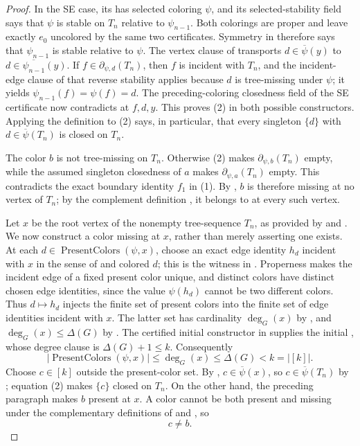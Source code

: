 \begin{proof}
In the SE case, its  has selected
coloring $\psi$, and its selected-stability field says that $\psi$ is
stable on $T_n$ relative to $\psi_{n-1}$.  Both colorings are proper and
leave exactly $e_0$ uncolored by the same two certificates.  Symmetry in
 therefore says that $\psi_{n-1}$ is stable relative to
$\psi$.  The vertex clause of  transports
$d\in\overline\psi(y)$ to
$d\in\overline{\psi_{n-1}}(y)$.  If
$f\in\partial_{\psi,d}(T_n)$, then $f$ is incident with $T_n$, and the
incident-edge clause of that reverse stability applies because $d$ is
tree-missing under $\psi$; it yields
$\psi_{n-1}(f)=\psi(f)=d$.  The preceding-coloring closedness field of
the SE certificate now contradicts  at
$f,d,y$.  This proves (2) in both possible constructors.  Applying the
definition  to (2) says, in particular, that
every singleton $\{d\}$ with
$d\in\overline\psi(T_n)$ is closed on $T_n$.

The color $b$ is not tree-missing on $T_n$.  Otherwise (2) makes
$\partial_{\psi,b}(T_n)$ empty, while the assumed singleton closedness
of $a$ makes $\partial_{\psi,a}(T_n)$ empty.  This contradicts the
exact boundary identity $f_1$ in (1).  By
, $b$ is therefore missing at no vertex of
$T_n$; by the complement definition , it belongs
to  at every such vertex.

Let $x$ be the root vertex of the nonempty tree-sequence $T_n$, as
provided by  and
.  We now construct a color missing at
$x$, rather than merely asserting one exists.  At each
$d\in\operatorname{PresentColors}(\psi,x)$, choose an exact edge identity
$h_d$ incident with $x$ in the sense of  and colored
$d$; this is the witness in .  Properness makes
the incident edge of a fixed present color unique, and distinct colors
have distinct chosen edge identities, since the value $\psi(h_d)$ cannot
be two different colors.
Thus $d\mapsto h_d$ injects the finite set of present colors into the
finite set of edge identities incident with $x$.  The latter set has
cardinality $\deg_G(x)$ by , and
$\deg_G(x)\leq\Delta(G)$ by .  The certified
initial constructor in  supplies the initial
, whose degree clause is
$\Delta(G)+1\leq k$.  Consequently
\[
 |\operatorname{PresentColors}(\psi,x)|
 \leq\deg_G(x)\leq\Delta(G)<k=|[k]|.
\]
Choose $c\in[k]$ outside the present-color set.  By
, $c\in\overline\psi(x)$, so
$c\in\overline\psi(T_n)$ by ; equation (2)
makes $\{c\}$ closed on $T_n$.  On the other hand, the preceding
paragraph makes $b$ present at $x$.  A color cannot be both present and
missing under the complementary definitions of 
and , so
\[
                         c\ne b.                  \tag{3}
\]


\end{proof}
